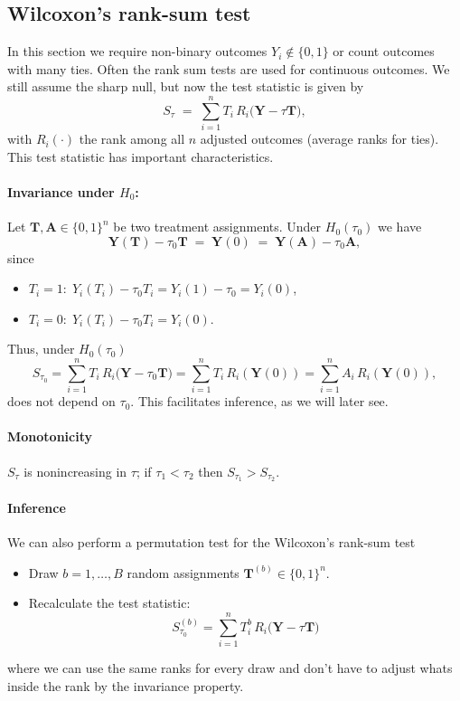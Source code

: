 \documentclass[11pt]{exam}
\theoremstyle{plain}
\newcommand{\bY}{\bm{Y}}
\begin{document}
\subsection{Wilcoxon’s rank-sum test}
In this section we require non-binary outcomes $Y_i \notin \{0, 1\}$ or count outcomes with many ties. Often the rank sum tests are used for continuous outcomes. We still assume the sharp null, but now the test statistic is given by
\[
S_\tau \;=\; \sum_{i=1}^n T_i\,R_i\!\big(\bm Y-\tau\bm T\big),
\]
with $R_i(\cdot)$ the rank among all $n$ adjusted outcomes (average ranks for ties). 
This test statistic has important characteristics.

\paragraph{Invariance under \(H_0\):} Let \(\bm T,\bm A\in\{0,1\}^n\) be two treatment assignments. Under $H_0(\tau_0)$ we have
  \[
    \bm Y(\bm T)-\tau_0\bm T \;=\; \bm Y(0) \;=\; \bm Y(\bm A)-\tau_0\bm A,
  \]
  \vspace{-0.5em}
  since
  \begin{itemize}
    \setlength{\itemsep}{4pt}
    \item \(T_i=1:\; Y_i(T_i)-\tau_0 T_i=Y_i(1)-\tau_0=Y_i(0)\),
    \item \(T_i=0:\; Y_i(T_i)-\tau_0 T_i=Y_i(0)\).
  \end{itemize}
  Thus, under $H_0(\tau_0)$
  \[
  S_{\tau_0} = \sum_{i=1}^n T_i\,R_i\!\big(\bm Y-\tau_0\bm T\big) = \sum_{i=1}^n T_i\,R_i\!(\bY(0)) = \sum_{i=1}^n A_i \,R_i\!(\bY(0)),
  \] 
  does not depend on \(\tau_0\). This facilitates inference, as we will later see.

\paragraph{Monotonicity} \(S_\tau\) is nonincreasing in \(\tau\); if \(\tau_1<\tau_2\) then \(S_{\tau_1}>S_{\tau_2}\).


\paragraph{Inference}
We can also perform a permutation test for the Wilcoxon’s rank-sum test 
\begin{itemize}
  \item Draw $b = 1,\ldots,B$ random assignments $\bm{T}^{(b)} \in \{0,1\}^n$.
  \item Recalculate the test statistic:
  \[
  S_{\tau_0}^{(b)} = \sum_{i=1}^n T^b_i\,R_i\!\big(\bm Y-\tau\bm T\big)
  \]
\end{itemize}
where we can use the same ranks for every draw and don't have to adjust whats inside the rank by the invariance property.
\end{document}
